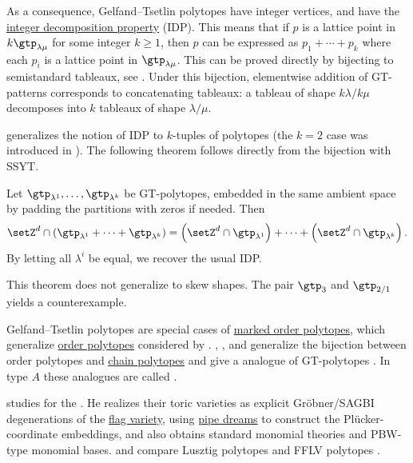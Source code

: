 As a consequence, Gelfand--Tsetlin polytopes have integer vertices,
and have the \hyperref[polytopeIDP]{integer decomposition property} (IDP).
This means that
if $p$ is a lattice point in $k \gtp_{\lambda\mu}$ for some integer $k\geq 1$,
then $p$ can be expressed as $p_1 + \dotsb + p_k$ where each $p_i$ is a
lattice point in $\gtp_{\lambda\mu}$.
This can be proved directly by bijecting to semistandard tableaux,
see \cite[Subsec.~2.3]{Alexandersson2016GTPoly}.  Under this bijection,
elementwise addition of GT-patterns corresponds to concatenating tableaux:
a tableau of shape $k\lambda/k\mu$ decomposes into $k$ tableaux of shape
$\lambda/\mu$.

 generalizes the notion of IDP to $k$-tuples of
polytopes (the $k=2$ case was introduced in \cite{HaaseHofmann2017}).
The following theorem follows directly from the bijection with SSYT.

\begin{theorem}[Alexandersson, 2018]
Let $\gtp_{\lambda^1},\dotsc,\gtp_{\lambda^k}$
be GT-polytopes, embedded in the same ambient space
by padding the partitions with zeros if needed.
Then
\[
\setZ^d \cap \left( \gtp_{\lambda^1} + \dotsb + \gtp_{\lambda^k} \right)
=
\left( \setZ^d \cap \gtp_{\lambda^1} \right) + \dotsb + \left(\setZ^d \cap \gtp_{\lambda^k} \right).
\]
By letting all $\lambda^i$ be equal, we recover the usual IDP.
\end{theorem}

This theorem does not generalize to skew shapes.  The pair $\gtp_{3}$
and $\gtp_{2/1}$ yields a counterexample.


Gelfand--Tsetlin polytopes are special cases of
\hyperref[markedOrderPolytopeDefinition]{marked order polytopes},
which generalize \hyperref[orderPolytope]{order polytopes} considered by
 \cite{Stanley86TwoPosetPolytopes}.
, , and 
generalize the bijection between order polytopes and
\hyperref[chainPolytope]{chain polytopes} and give a
\label{markedChainPolytope} analogue
of GT-polytopes \cite{ArdilaBliemSalazar2011}.
In type $A$ these analogues are called
\label{fflvPolytope}.

 studies
\label{markedChainOrderPolytope}
for the \label{gtPoset} \cite{Makhlin2024}.
He realizes their toric varieties
as explicit Gröbner/SAGBI degenerations of the \hyperref[flagVarieties]{flag
variety}, using \hyperref[schubertPipeDream]{pipe dreams} to construct the
Plücker-coordinate embeddings, and also obtains standard monomial theories and
PBW-type monomial bases.
 and  compare Lusztig polytopes and
FFLV polytopes \cite{FangKoshevoy2020x}.

